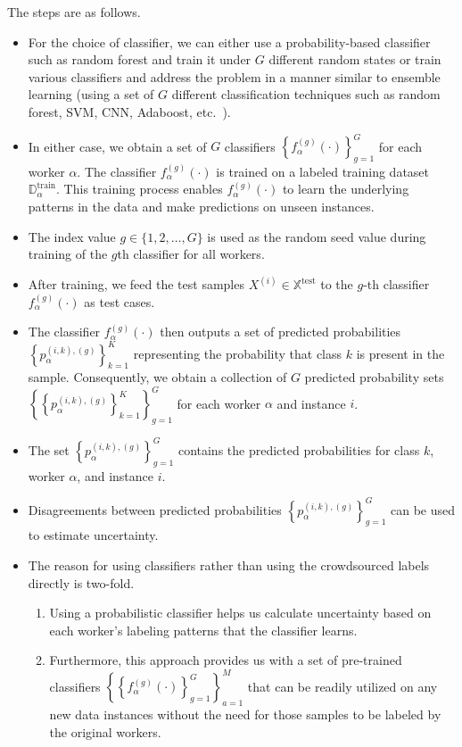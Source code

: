 The steps are as follows.
\begin{itemize}
    \item For the choice of classifier, we can either use a probability-based classifier such as random forest and train it under $G $ different random states or train various classifiers and address the problem in a manner similar to ensemble learning (using a set of $G $ different classification techniques such as random forest, SVM, CNN, Adaboost, etc.~\cite{zhou_Ensemblelearning_2009}).

    \item In either case, we obtain a set of $G $ classifiers ${\left\{f_{\alpha}^{(g)}( \cdot)\right\}}_{g=1}^G $ for each worker $\alpha $. The classifier $f_{\alpha}^{(g)}( \cdot) $ is trained on a labeled training dataset $\mathbb{D}_\alpha^{\mathrm{train}}$. This training process enables $f_{\alpha}^{(g)}(\cdot) $ to learn the underlying patterns in the data and make predictions on unseen instances.

    \item The index value $g  \in \{1,2,\dots,G\} $ is used as the random seed value during training of the $g$\-th classifier for all workers.

    \item After training, we feed the test samples $X^{(i)}\in \mathbb{X}^{\text{test}} $ to the $g $-th classifier $f_{\alpha}^{(g)}(\cdot) $ as test cases.

    \item The classifier $f_{\alpha}^{(g)}(\cdot) $ then outputs a set of predicted probabilities ${\left\{p_{\alpha}^{(i,k),(g)}\right\}}_{k=1}^{K} $ representing the probability that class $k $ is present in the sample. Consequently, we obtain a collection of $G $ predicted probability sets ${\left\{ {\left\{ p_{\alpha}^{(i,k),(g)}\right\}}_{k=1}^K \right\}}_{g=1}^G $ for each worker $\alpha $ and instance $i $.

    \item The set ${\left\{p_{\alpha}^{(i,k),(g)}\right\}}_{g=1}^G $ contains the predicted probabilities for class $k $,
    worker $\alpha $, and instance $i $.

    \item Disagreements between predicted probabilities ${\left\{p_{\alpha}^{(i,k),(g)}\right\}}_{g=1}^G $ can be used to estimate uncertainty.

    \item The reason for using classifiers rather than using the crowdsourced labels directly is two-fold.
    \begin{enumerate}
        \item Using a probabilistic classifier helps us calculate uncertainty based on each worker's labeling patterns that the classifier learns.
        \item Furthermore, this approach provides us with a set of pre-trained classifiers ${\left\{ {\left\{f_{\alpha}^{(g)}(\cdot) \right\}}_{g=1}^G  \right\}}_{a=1}^{M} $ that can be readily utilized on any new data instances without the need for those samples to be labeled by the original workers.
    \end{enumerate}


\end{itemize}

